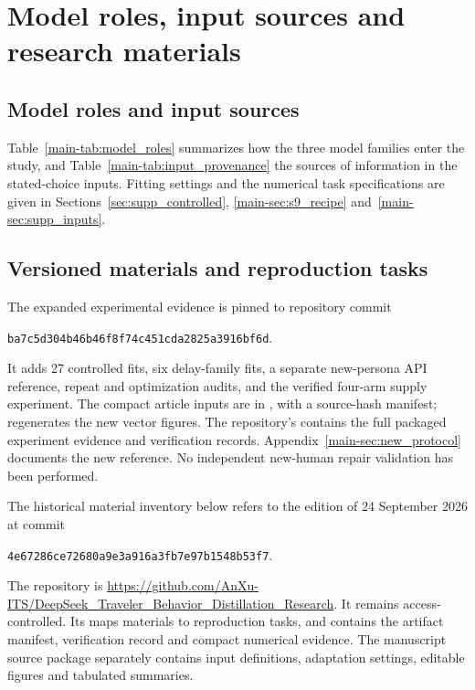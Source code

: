 \section{Model roles, input sources and research materials}
\label{sec:materials_scope}

\subsection{Model roles and input sources}
Table~\ref{main-tab:model_roles} summarizes how the three model families enter the study, and Table~\ref{main-tab:input_provenance} the sources of information in the stated-choice inputs. Fitting settings and the numerical task specifications are given in Sections~\ref{sec:supp_controlled}, \ref{main-sec:s9_recipe} and~\ref{main-sec:supp_inputs}.




\FloatBarrier

\subsection{Versioned materials and reproduction tasks}
The expanded experimental evidence is pinned to repository commit
\begin{center}\small\texttt{ba7c5d304b46b46f8f74c451cda2825a3916bf6d}.\end{center}
It adds 27 controlled fits, six delay-family fits, a separate new-persona API reference, repeat and optimization audits, and the verified four-arm supply experiment. The compact article inputs are in , with a source-hash manifest;  regenerates the new vector figures. The repository's  contains the full packaged experiment evidence and verification records. Appendix~\ref{main-sec:new_protocol} documents the new reference. No independent new-human repair validation has been performed.

The historical material inventory below refers to the edition of 24 September 2026 at commit
\begin{center}\small\texttt{4e67286ce72680a9e3a916a3fb7e97b1548b53f7}.\end{center}
The repository is \url{https://github.com/AnXu-ITS/DeepSeek_Traveler_Behavior_Distillation_Research}. It remains access-controlled. Its  maps materials to reproduction tasks, and  contains the artifact manifest, verification record and compact numerical evidence. The manuscript source package separately contains input definitions, adaptation settings, editable figures and tabulated summaries.

